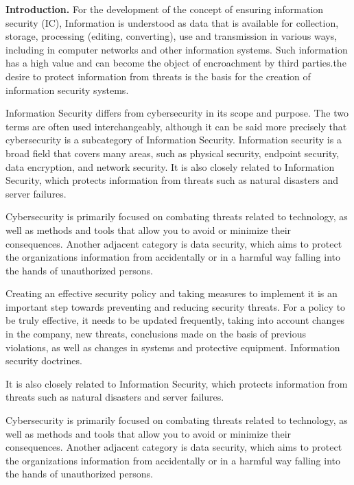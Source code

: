 \begin{multicols}{2}
{\bfseries Introduction.} For the development of the concept of ensuring
information security (IC), Information is understood as data that is
available for collection, storage, processing (editing, converting), use
and transmission in various ways, including in computer networks and
other information systems. Such information has a high value and can
become the object of encroachment by third parties.the desire to protect
information from threats is the basis for the creation of information
security systems.

Information Security differs from cybersecurity in its scope and
purpose. The two terms are often used interchangeably, although it can
be said more precisely that cybersecurity is a subcategory of
Information Security. Information security is a broad field that covers
many areas, such as physical security, endpoint security, data
encryption, and network security. It is also closely related to
Information Security, which protects information from threats such as
natural disasters and server failures.

Cybersecurity is primarily focused on combating threats related to
technology, as well as methods and tools that allow you to avoid or
minimize their consequences. Another adjacent category is data security,
which aims to protect the organization\textquotesingle s information
from accidentally or in a harmful way falling into the hands of
unauthorized persons.

Creating an effective security policy and taking measures to implement
it is an important step towards preventing and reducing security
threats. For a policy to be truly effective, it needs to be updated
frequently, taking into account changes in the company, new threats,
conclusions made on the basis of previous violations, as well as changes
in systems and protective equipment. Information security doctrines.

It is also closely related to Information Security, which protects
information from threats such as natural disasters and server failures.

Cybersecurity is primarily focused on combating threats related to
technology, as well as methods and tools that allow you to avoid or
minimize their consequences. Another adjacent category is data security,
which aims to protect the organization\textquotesingle s information
from accidentally or in a harmful way falling into the hands of
unauthorized persons.


\end{multicols}
